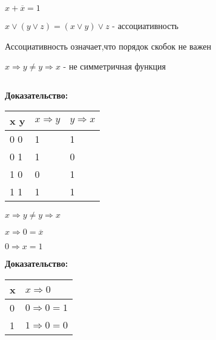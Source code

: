 \documentclass[russian]{lecture-notes}
\begin{document}
\begin{sloppypar}
\begin{proposition}
            $x + \overline{x} = 1 $

        \end{proposition}

        \begin{proposition}

            $x \lor (y\lor z) = (x \lor y ) \lor z$ - ассоциативность

            Ассоциативность означает,что порядок скобок не важен

            \begin{example}
                $x \Rightarrow y \neq y \Rightarrow x$ - не симметричная функция

                $$$$

                \textbf{Доказательство: }

                \begin{table}[h!]
                    \centering
                    \begin{tabular}{|l|l|l|}
                        \hline
                        x y & $x \Rightarrow y$ & $y \Rightarrow x$ \\ \hline
                        0 0 & 1                 & 1                 \\ \hline
                        0 1 & 1                 & 0                 \\ \hline
                        1 0 & 0                 & 1                 \\ \hline
                        1 1 & 1                 & 1                 \\ \hline
                    \end{tabular}
                \end{table}

            \end{example}

            \begin{remark}
                $x \Rightarrow y \neq y\Rightarrow x$
            \end{remark}

            $x \Rightarrow 0 = \overline{x}$

            $0 \Rightarrow x = 1$
            $$$$

            \textbf{Доказательство: }

            \begin{table}[h!]
                \centering
                \begin{tabular}{|l|l|}
                    \hline
                    x & $x \Rightarrow 0$     \\ \hline
                    0 & $0 \Rightarrow 0 = 1$ \\ \hline
                    1 & $1 \Rightarrow 0 = 0$ \\ \hline
                \end{tabular}
            \end{table}


\end{proposition}
\end{sloppypar}
\end{document}
